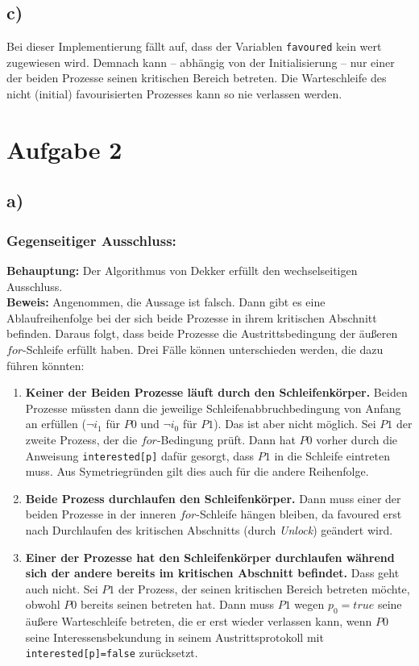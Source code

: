 \documentclass[11pt,a4paper,DIV=10,]{scrartcl}
\begin{document}
\subsection*{c)}
Bei dieser Implementierung fällt auf, dass der Variablen \texttt{favoured} kein wert zugewiesen wird. Demnach kann -- abhängig von der Initialisierung -- nur einer der beiden Prozesse seinen kritischen Bereich betreten. Die Warteschleife des nicht (initial) favourisierten Prozesses kann so nie verlassen werden.
\section*{Aufgabe 2}
\subsection*{a)}
\subsubsection*{Gegenseitiger Ausschluss:}
\textbf{Behauptung:} Der Algorithmus von Dekker erfüllt den wechselseitigen Ausschluss.\\
\textbf{Beweis:} Angenommen, die Aussage ist falsch. Dann gibt es eine Ablaufreihenfolge bei der sich beide Prozesse in ihrem kritischen Abschnitt befinden. Daraus folgt, dass beide Prozesse die Austrittsbedingung  der äußeren $for$-Schleife erfüllt haben. Drei Fälle können unterschieden werden, die dazu führen könnten:
\begin{enumerate}
\item \textbf{Keiner der Beiden Prozesse läuft durch den Schleifenkörper.} Beiden Prozesse müssten dann die jeweilige Schleifenabbruchbedingung von Anfang an erfüllen ($\neg i_1$ für $P0$ und $\neg i_0$ für $P1$). Das ist aber nicht möglich. Sei $P1$ der zweite Prozess, der die $for$-Bedingung prüft. Dann hat $P0$ vorher durch die Anweisung  \texttt{interested[p]} dafür gesorgt, dass $P1$ in die Schleife eintreten muss. Aus Symetriegründen gilt dies auch für die andere Reihenfolge.
\item \textbf{Beide Prozess durchlaufen den Schleifenkörper.} Dann muss einer der beiden Prozesse in der inneren $for$-Schleife hängen bleiben, da favoured erst nach Durchlaufen des kritischen Abschnitts (durch \textit{Unlock}) geändert wird.
\item \textbf{Einer der Prozesse hat den Schleifenkörper durchlaufen während sich der andere bereits im kritischen Abschnitt befindet.} Dass geht auch nicht. Sei $P1$ der Prozess, der seinen kritischen Bereich betreten möchte, obwohl $P0$ be\-reits seinen betreten hat. Dann muss $P1$ wegen $p_0=true$ seine äußere Warteschleife betreten, die er erst wieder verlassen kann, wenn $P0$ seine Interessensbekundung in seinem  Austrittsprotokoll mit \texttt{interested[p]=false} zurücksetzt. 
\end{enumerate}
\end{document}

